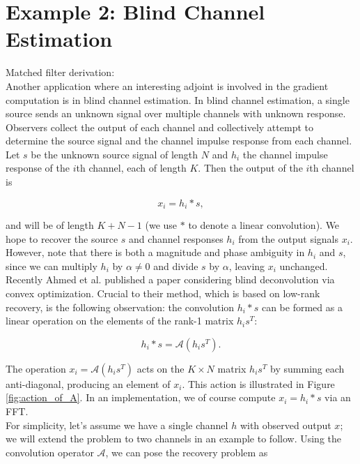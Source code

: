 \documentclass[journal]{IEEEtran}
\begin{document}
\section{Example 2: Blind Channel Estimation}
Matched filter derivation: \cite{claerbout_1992}\\

Another application where an interesting adjoint is involved in the gradient computation is in blind channel estimation.  In blind channel estimation, a single source sends an unknown signal over multiple channels with unknown response.  Observers collect the output of each channel and collectively attempt to determine the source signal and the channel impulse response from each channel.  Let $s$ be the unknown source signal of length $N$ and $h_i$ the channel impulse response of the $i$th channel, each of length $K$.  Then the output of the $i$th channel is

\[ x_i = h_i\ast s, \] 

\noindent and will be of length $K+N-1$ (we use $\ast$ to denote a linear convolution).  We hope to recover the source $s$ and channel responses $h_i$ from the output signals $x_i$.   However, note that there is both a magnitude and phase ambiguity in $h_i$ and $s$, since we can multiply $h_i$ by $\alpha\neq 0$ and divide $s$ by $\alpha$, leaving $x_i$ unchanged.\\

Recently Ahmed et al. \cite{ahmed_2013} published a paper considering blind deconvolution via convex optimization.  Crucial to their method, which is based on low-rank recovery, is the following observation: the convolution $h_i\ast s$ can be formed as a linear operation on the elements of the rank-1 matrix $h_is^T$:

\[ h_i\ast s = \mathcal{A}(h_is^T). \] 

\noindent The operation $x_i=\mathcal{A}(h_is^T)$ acts on the $K\times N$ matrix $h_is^T$ by summing each anti-diagonal, producing an element of $x_i$.  This action is illustrated in Figure \ref{fig:action_of_A}.  In an implementation, we of course compute $x_i=h_i\ast s$ via an FFT.\\

For simplicity, let's assume we have a single channel $h$ with observed output $x$; we will extend the problem to two channels in an example to follow.  Using the convolution operator $\mathcal{A}$, we can pose the recovery problem as
\end{document}
